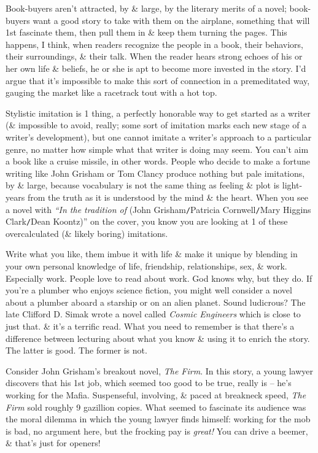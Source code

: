 \documentclass{article}
\numberwithin{equation}{section}
\begin{document}
Book-buyers aren't attracted, by \& large, by the literary merits of a novel; book-buyers want a good story to take with them on the airplane, something that will 1st fascinate them, then pull them in \& keep them turning the pages. This happens, I think, when readers recognize the people in a book, their behaviors, their surroundings, \& their talk. When the reader hears strong echoes of his or her own life \& beliefs, he or she is apt to become more invested in the story. I'd argue that it's impossible to make this sort of connection in a premeditated way, gauging the market like a racetrack tout with a hot top.

Stylistic imitation is 1 thing, a perfectly honorable way to get started as a writer (\& impossible to avoid, really; some sort of imitation marks each new stage of a writer's development), but one cannot imitate a writer's approach to a particular genre, no matter how simple what that writer is doing may seem. You can't aim a book like a cruise missile, in other words. People who decide to make a fortune writing like John Grisham or Tom Clancy produce nothing but pale imitations, by \& large, because vocabulary is not the same thing as feeling \& plot is light-years from the truth as it is understood by the mind \& the heart. When you see a novel with \textit{``In the tradition of} (John Grisham{\tt/}Patricia Cornwell{\tt/}Mary Higgins Clark{\tt/}Dean Koontz)'' on the cover, you know you are looking at 1 of these overcalculated (\& likely boring) imitations.

Write what you like, them imbue it with life \& make it unique by blending in your own personal knowledge of life, friendship, relationships, sex, \& work. Especially work. People love to read about work. God knows why, but they do. If you're a plumber who enjoys science fiction, you might well consider a novel about a plumber aboard a starship or on an alien planet. Sound ludicrous? The late Clifford D. Simak wrote a novel called \textit{Cosmic Engineers} which is close to just that. \& it's a terrific read. What you need to remember is that there's a difference between lecturing about what you know \& using it to enrich the story. The latter is good. The former is not.

Consider John Grisham's breakout novel, \textit{The Firm}. In this story, a young lawyer discovers that his 1st job, which seemed too good to be true, really is -- he's working for the Mafia. Suspenseful, involving, \& paced at breakneck speed, \textit{The Firm} sold roughly 9 gazillion copies. What seemed to fascinate its audience was the moral dilemma in which the young lawyer finds himself: working for the mob is bad, no argument here, but the frocking pay is \textit{great!} You can drive a beemer, \& that's just for openers!
\end{document}
